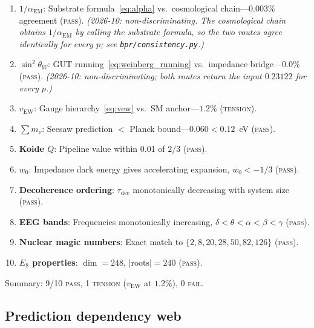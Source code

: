 \documentclass[aps,prd,twocolumn,superscriptaddress,longbibliography,nofootinbib]{revtex4-2}
\newcommand{\vEW}{v_{\mathrm{EW}}}
\newcommand{\sinW}{\sin^2\!\theta_W}
\newcommand{\alphaEM}{\alpha_{\mathrm{EM}}}
\begin{document}
\begin{enumerate}
\item \textbf{$1/\alphaEM$}: Substrate formula~\eqref{eq:alpha}
  vs.\ cosmological chain---$0.003\%$ agreement (\textsc{pass}).
  \textit{(2026-10: non-discriminating.  The cosmological chain
  obtains $1/\alphaEM$ by calling the substrate formula, so the two
  routes agree identically for every $p$; see
  \texttt{bpr/consistency.py}.)}

\item \textbf{$\sinW$}: GUT running~\eqref{eq:weinberg_running}
  vs.\ impedance bridge---$0.0\%$ (\textsc{pass}).
  \textit{(2026-10: non-discriminating; both routes return the input $0.23122$ for every $p$.)}

\item \textbf{$\vEW$}: Gauge hierarchy~\eqref{eq:vew} vs.\ SM
  anchor---$1.2\%$ (\textsc{tension}).

\item \textbf{$\sum m_\nu$}: Seesaw prediction $< $ Planck
  bound---$0.060 < 0.12$~eV (\textsc{pass}).

\item \textbf{Koide $Q$}: Pipeline value within 0.01 of $2/3$
  (\textsc{pass}).

\item \textbf{$w_0$}: Impedance dark energy gives accelerating
  expansion, $w_0 < -1/3$ (\textsc{pass}).

\item \textbf{Decoherence ordering}: $\tau_{\mathrm{dec}}$
  monotonically decreasing with system size (\textsc{pass}).

\item \textbf{EEG bands}: Frequencies monotonically increasing,
  $\delta < \theta < \alpha < \beta < \gamma$ (\textsc{pass}).

\item \textbf{Nuclear magic numbers}: Exact match to
  $\{2, 8, 20, 28, 50, 82, 126\}$ (\textsc{pass}).

\item \textbf{$E_8$ properties}: $\dim = 248$, $|\text{roots}| =
  240$ (\textsc{pass}).
\end{enumerate}

Summary: 9/10 \textsc{pass}, 1 \textsc{tension} ($\vEW$ at
$1.2\%$), 0 \textsc{fail}.

\subsection{Prediction dependency web}
\end{document}
